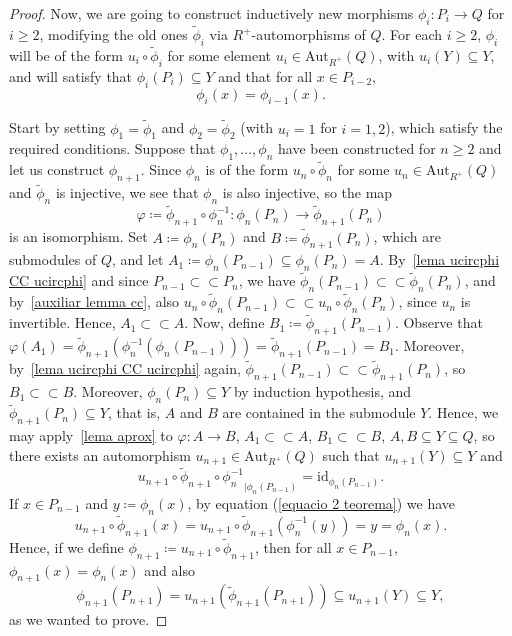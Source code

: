 \documentclass[11pt]{amsart}
\numberwithin{equation}{section}
\theoremstyle{definition}
\theoremstyle{plain}
\theoremstyle{definition}
\begin{document}
\begin{proof}
Now, we are going to construct inductively new morphisms $\phi_i \colon P_i \rightarrow Q$ for $i \geq 2$, modifying the old ones $\tilde{\phi}_i$ via $R^+$-automorphisms of $Q$. For each $i \geq 2$, $\phi_i$ will be of the form $u_i \circ \tilde{\phi}_i$ for some element $u_i \in \mathrm{Aut}_{R^+}(Q)$, with $u_i(Y)\subseteq Y$, and will satisfy that $\phi_{i}(P_i) \subseteq Y$
and that for all $x \in P_{i-2}$,
\begin{equation*} 
    \phi_{i}(x) = \phi_{i-1}(x).
\end{equation*}

Start by setting $\phi_1 = \tilde{\phi}_1$ and $\phi_2 = \tilde{\phi}_2$ (with $u_i=1$ for $i=1,2$), which satisfy the required conditions. Suppose that $\phi_1, \dots, \phi_n$ have been constructed for $n \geq 2$ and let us construct $\phi_{n+1}$. Since $\phi_n$ is of the form $u_n \circ \tilde{\phi}_n$ for some $u_n \in \mathrm{Aut}_{R^+}(Q)$ and $\tilde{\phi}_n$ is injective, we see that $\phi_n$ is also injective, so the map $$\varphi \coloneqq \tilde{\phi}_{n+1}\circ\phi_{n}^{-1} \colon \phi_n(P_n) \rightarrow \tilde{\phi}_{n+1}(P_n)$$ is an isomorphism. Set $A \coloneqq \phi_n(P_n)$ and $B \coloneqq \tilde{\phi}_{n+1}(P_n)$, which are submodules of $Q$, and let $A_1 \coloneqq \phi_n(P_{n-1}) \subseteq \phi_n(P_n) = A$. By~\autoref{lema ucircphi CC ucircphi} and since $P_{n-1} \subset\!\subset P_n$, we have $\tilde{\phi}_n(P_{n-1}) \subset\!\subset \tilde{\phi}_{n}(P_n)$, and by~\autoref{auxiliar lemma cc}, also $u_n \circ \tilde{\phi}_n(P_{n-1}) \subset\!\subset u_n \circ \tilde{\phi}_{n}(P_n)$, since $u_n$ is invertible. Hence, $A_1 \subset\!\subset A$. Now, define $B_1 \coloneqq \tilde{\phi}_{n+1}(P_{n-1})$. Observe that $\varphi(A_1) = \tilde{\phi}_{n+1}(\phi_{n}^{-1}(\phi_n(P_{n-1}))) = \tilde{\phi}_{n+1}(P_{n-1}) = B_1$. Moreover, by~\autoref{lema ucircphi CC ucircphi} again, $\tilde{\phi}_{n+1}(P_{n-1}) \subset\!\subset \tilde{\phi}_{n+1}(P_{n})$, so $B_1 \subset\!\subset B$. Moreover, $\phi_n(P_n) \subseteq Y$ by induction hypothesis, and $\tilde{\phi}_{n+1}(P_n) \subseteq Y$, that is, $A$ and $B$ are contained in the submodule $Y$. Hence, we may apply~\autoref{lema aprox} to $\varphi \colon A \rightarrow B$, $A_1 \subset\!\subset A$, $B_1  \subset\!\subset B$, $A, B \subseteq Y \subseteq Q$, so there exists an automorphism $u_{n+1} \in \mathrm{Aut}_{R^+}(Q)$ such that $u_{n+1}(Y)\subseteq Y$ and
\begin{equation} \label{equacio 2 teorema}
u_{n+1} \circ \tilde{\phi}_{n+1}\circ{\phi_{n}^{-1}}_{|\phi_n(P_{n-1})} = \mathrm{id}_{\phi_n(P_{n-1})}.    
\end{equation}
If $x \in P_{n-1}$ and $y \coloneqq \phi_n(x)$, by equation (\ref{equacio 2 teorema}) we have
\begin{equation*}
u_{n+1} \circ \tilde{\phi}_{n+1}(x) = u_{n+1} \circ \tilde{\phi}_{n+1}(\phi_n^{-1}(y)) = y = \phi_n(x).
\end{equation*} 
Hence, if we define $\phi_{n+1} \coloneqq u_{n+1} \circ \tilde{\phi}_{n+1}$, then for all $x \in P_{n-1}$, $\phi_{n+1}(x) = \phi_n(x)$ and also 
$$\phi_{n+1}(P_{n+1}) =u_{n+1}(\tilde{\phi}_{n+1}(P_{n+1}))
\subseteq u_{n+1}(Y)\subseteq Y,$$ 
as we wanted to prove.


\end{proof}
\end{document}
